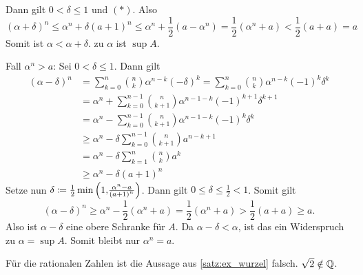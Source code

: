 \documentclass[../ana1.tex]{subfiles}
\begin{document}
\begin{bew}
\begin{faelle}
			Dann gilt \(0<\delta\leq 1\) und \((*) \). Also
			\[ {(\alpha + \delta)}^n \leq \alpha^n + \delta {(a+1)}^n \leq \alpha^n + \frac{1}{2} (a-\alpha^n) = \frac{1}{2} (\alpha^n+a) < \frac{1}{2} (a+a) =a \]
			Somit ist \(\alpha < \alpha + \delta \). \Lightning{} zu \(\alpha \) ist \(\sup A\). \\
		\item[Fall \(\alpha^n > a\):] Sei \(0 < \delta \leq 1 \). Dann gilt
			\!\begin{align}
				{(\alpha - \delta)}^n & = \sum_{k=0}^{n} \binom{n}{k} \alpha^{n-k} {(-\delta)}^k = \sum_{k=0}^{n} \binom{n}{k} \alpha^{n-k} {(-1)}^k\delta^k \nonumber \\
								      & = \alpha^n + \sum_{k=0}^{n-1} \binom{n}{k+1} \alpha^{n-1-k} {(-1)}^{k+1}\delta^{k+1} \nonumber \\
								   	  & = \alpha^n - \sum_{k=0}^{n-1} \binom{n}{k+1} \alpha^{n-1-k} {(-1)}^{k} \delta^k \nonumber \\
									  & \geq \alpha^n - \delta \sum_{k=0}^{n-1} \binom{n}{k+1} a^{n-k+1} \nonumber \\
									  & = \alpha^n - \delta \sum_{k=1}^{n} \binom{n}{k} a^k \nonumber \\
					 				  & \geq \alpha^n - \delta {(a+1)}^n \tag{**}
			\end{align}
			Setze nun \( \delta \coloneqq \frac{1}{2} \min \left(1 \text{,} \frac{\alpha^n-a}{{(a+1)}^n} \right) \). Dann gilt \(0 \leq \delta \leq \frac{1}{2} < 1 \). Somit gilt
			\[{(\alpha -\delta)}^n \geq \alpha^n - \frac{1}{2} (\alpha^n + a) = \frac{1}{2} (\alpha^n + a) > \frac{1}{2} (a + a) \geq a. \]
			Also ist \( \alpha - \delta \) eine obere Schranke für \(A \). Da \(\alpha - \delta < \alpha \), ist das ein Widerspruch zu \(\alpha = \sup A\). Somit bleibt nur \(\alpha^n = a\).
	\end{faelle}
\end{bew}

\begin{bem}
	Für die rationalen Zahlen ist die Aussage aus \autoref{satz:ex_wurzel} falsch. \zB \(\sqrt{2} \notin \mathbb{Q} \).
\end{bem}
\end{document}
